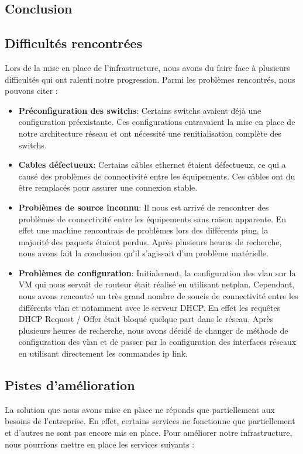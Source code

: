 \documentclass[a4paper,12pt]{report}
\begin{document}
\begin{itemize}
    \chapter{Conclusion}
        \section{Difficultés rencontrées}

            Lors de la mise en place de l'infrastructure, nous avons du faire face à plusieurs difficultés qui ont ralenti notre progression. Parmi les problèmes rencontrés, nous pouvons citer :

            \begin{itemize}
                \item \textbf{Préconfiguration des switchs}: Certains switchs avaient déjà une configuration préexistante. Ces configurations entravaient la mise en place de notre architecture réseau et ont nécessité une renitialisation complète des switchs.
                \item \textbf{Cables défectueux}: Certains câbles ethernet étaient défectueux, ce qui a causé des problèmes de connectivité entre les équipements. Ces câbles ont du être remplacés pour assurer une connexion stable.
                \item \textbf{Problèmes de source inconnu}: Il nous est arrivé de rencontrer des problèmes de connectivité entre les équipements sans raison apparente. En effet une machine rencontrais de problèmes lors des différents ping, la majorité des paquets étaient perdus. Après plusieurs heures de recherche, nous avons fait la conclusion qu'il s'agissait d'un problème matérielle.
                \item \textbf{Problèmes de configuration}: Initialement, la configuration des vlan sur la VM qui nous servait de routeur était réalisé en utilisant netplan. Cependant, nous avons rencontré un très grand nombre de soucis de connectivité entre les différents vlan et notamment avec le serveur DHCP. En effet les requêtes DHCP Request / Offer était bloqué quelque part dans le réseau. Après plusieurs heures de recherche, nous avons décidé de changer de méthode de configuration des vlan et de passer par la configuration des interfaces réseaux en utilisant directement les commandes ip link. 
            \end{itemize}

        \section{Pistes d'amélioration}
            La solution que nous avons mise en place ne réponds que partiellement aux besoins de l'entreprise. En effet, certains services ne fonctionne que partiellement et d'autres ne sont pas encore mis en place. Pour améliorer notre infrastructure, nous pourrions mettre en place les services suivants :


\end{itemize}
\end{document}
